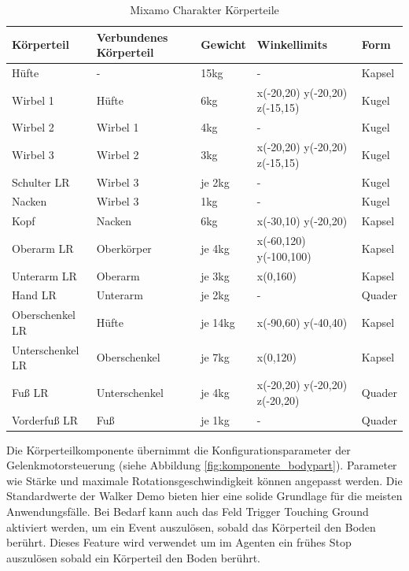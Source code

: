 \begin{table}[H]
  \centering
  {
  \begin{tabular}{ |p{3cm}|p{3cm}|p{2cm}|p{4cm}|p{2cm}| }
  \hline
  \textbf{Körpertei}l& \textbf{Verbundenes Körperteil} & \textbf{Gewicht} & \textbf{Winkellimits} & \textbf{Form} \\
  \hline
  Hüfte & - & 15kg & - & Kapsel \\
  \hline
  Wirbel 1 & Hüfte & 6kg & x(-20,20) y(-20,20) z(-15,15) & Kugel \\
  \hline
  Wirbel 2 & Wirbel 1 & 4kg & - & Kugel \\
  \hline
  Wirbel 3 & Wirbel 2 & 3kg & x(-20,20) y(-20,20) z(-15,15) & Kugel \\
  \hline
  Schulter LR & Wirbel 3 & je 2kg& - & Kugel \\
  \hline
  Nacken & Wirbel 3 & 1kg & - & Kugel \\
  \hline
  Kopf & Nacken & 6kg & x(-30,10) y(-20,20) & Kapsel \\
  \hline
  Oberarm LR & Oberkörper & je 4kg & x(-60,120) y(-100,100) & Kapsel \\
  \hline
  Unterarm LR & Oberarm & je 3kg & x(0,160) & Kapsel \\
  \hline
  Hand LR & Unterarm & je 2kg & - & Quader \\
  \hline
  Oberschenkel LR & Hüfte & je 14kg& x(-90,60) y(-40,40) & Kapsel \\
  \hline
  Unterschenkel LR & Oberschenkel & je 7kg &  x(0,120) & Kapsel \\
  \hline
  Fuß LR & Unterschenkel & je 4kg & x(-20,20) y(-20,20) z(-20,20) & Quader \\
  \hline
  Vorderfuß LR & Fuß & je 1kg & - & Quader \\
  \hline
  \end{tabular}}
  \caption{Mixamo Charakter Körperteile}
  \label{table:mixamo_körperteile}
\end{table}

Die Körperteilkomponente übernimmt die Konfigurationsparameter der Gelenkmotorsteuerung (siehe Abbildung \ref{fig:komponente_bodypart}). Parameter wie Stärke und maximale Rotationsgeschwindigkeit können angepasst werden. Die Standardwerte der Walker Demo bieten hier eine solide Grundlage für die meisten Anwendungsfälle. Bei Bedarf kann auch das Feld \grqq{}Trigger Touching Ground\grqq{} aktiviert werden, um ein Event auszulösen, sobald das Körperteil den Boden berührt. Dieses Feature wird verwendet um im Agenten ein frühes Stop auszulösen sobald ein Körperteil den Boden berührt.

